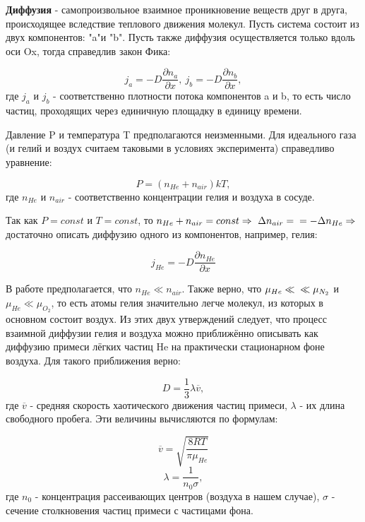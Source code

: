 \documentclass[15pt,a5paper,reqno]{article}
\begin{document}
	\textbf{Диффузия} - самопроизвольное взаимное проникновение веществ друг в друга, происходящее вследствие теплового движения молекул.
	Пусть система состоит из двух компонентов: "a"\>и "b". Пусть также диффузия осуществляется только вдоль оси Ox, тогда справедлив закон Фика:
	
	\[j_a = -D\frac{\partial n_a}{\partial x},\>j_b = -D\frac{\partial n_b}{\partial x},\]
	где $j_a$ и $j_b$ - соответственно плотности потока компонентов a и b, то есть число частиц, проходящих через единичную площадку в единицу времени.
	
	Давление P и температура T предполагаются неизменными. Для идеального газа (и гелий и воздух считаем таковыми в условиях эксперимента) справедливо уравнение:
	
	\[P = (n_{He} + n_{air})kT,\]
	где $n_{He}$ и $n_{air}$ - соответственно концентрации гелия и воздуха в сосуде.
	
	Так как $P = const$ и $T = const$, то $n_{He} + n_{air} = const \Rightarrow\ \Delta n_{air} =\\= -\Delta n_{He} \Rightarrow$ достаточно описать диффузию одного из компонентов, например, гелия:
	
	\begin{equation}\label{Helium}
	    j_{He} = -D\frac{\partial n_{He}}{\partial x}
	\end{equation}
	
	В работе предполагается, что $n_{He} \ll n_{air}$. Также верно, что $\mu_{He} \ll\\\ll \mu_{N_2}$ и $\mu_{He} \ll \mu_{O_2}$, то есть атомы гелия значительно легче молекул, из которых в основном состоит воздух. Из этих двух утверждений следует, что процесс взаимной диффузии гелия и воздуха можно приближённо описывать как диффузию примеси лёгких частиц He на практически стационарном фоне воздуха. Для такого приближения верно:
	
	\begin{equation}\label{D_koeff}
	    D = \frac{1}{3}\lambda\overline{v},
	\end{equation}
	где $\overline{v}$ - средняя скорость хаотического движения частиц примеси, $\lambda$ - их длина свободного пробега. Эти величины вычисляются по формулам:
	
	\begin{equation}\label{av_speed}
	    \overline{v} = \sqrt{\frac{8RT}{\pi\mu_{He}}}
	\end{equation}
	\begin{equation}\label{free_run}
	    \lambda = \frac{1}{n_0\sigma},
	\end{equation}
	где $n_0$ - концентрация рассеивающих центров (воздуха в нашем случае), $\sigma$ - сечение столкновения частиц примеси с частицами фона.
	
\end{document}
